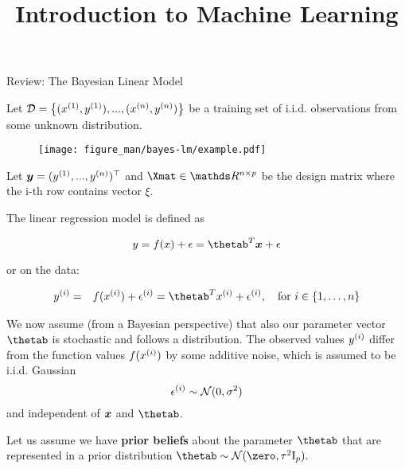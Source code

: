 




\newcommand{\titlefigure}{figure_man/question.png} %
\newcommand{\learninggoals}{
  \item \textcolor{blue}{XXX}
  \item \textcolor{blue}{XXX}
}

\title{Introduction to Machine Learning}
\date{}





\begin{vbframe}{Review: The Bayesian Linear Model}

Let $\D = \left\{(\xi[1], \yi[1]), ..., (\xi[n], \yi[n])\right\}$ be a training set of i.i.d. observations from some unknown distribution.

\begin{figure}
  \texttt{[image: figure\_man/bayes-lm/example.pdf]}
\end{figure}

Let $\yv = (\yi[1], ..., \yi[n])^\top$ and $\Xmat \in \R^{n \times p}$ be the design matrix where the i-th row contains vector $\xi$.  

\framebreak

The linear regression model is defined as

$$
y = \fx + \epsilon = \thetab^T \xv + \epsilon 
$$

or on the data:

\begin{eqnarray*}
\yi &=& \fxi + \epsi = \thetab^T \xi + \epsi, \quad \text{for } i \in \{1, \ldots, n\}
\end{eqnarray*}


We now assume (from a Bayesian perspective) that also our parameter vector $\thetab$ is stochastic and follows a distribution.
The observed values $\yi$ differ from the function values $\fxi$ by some additive noise, which is assumed to be i.i.d. Gaussian 
$$
\epsi \sim \mathcal{N}(0, \sigma^2)$$
and independent of $\xv$ and $\thetab$.

\framebreak

Let us assume we have \textbf{prior beliefs} about the parameter $\thetab$ that are represented in a prior distribution $\thetab \sim \mathcal{N}(\zero, \tau^2 \id_p).$

\lz 


\end{vbframe}
